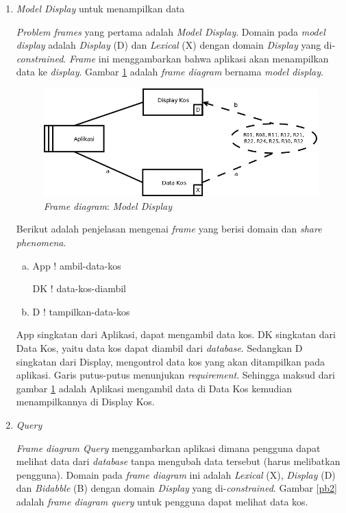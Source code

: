 		\begin{enumerate}[-]
			\item \textit{Model Display} untuk menampilkan data
			
			\textit{Problem frames} yang pertama adalah \textit{Model Display}. Domain pada \textit{model display} adalah \textit{Display} (D) dan \textit{Lexical} (X) dengan domain \textit{Display} yang di-\textit{constrained}. \textit{Frame} ini menggambarkan bahwa aplikasi akan menampilkan data ke \textit{display}. Gambar \ref{pb1} adalah \textit{frame diagram} bernama \textit{model display}.
			
			\begin{figure}[H]
				\centering
				\includegraphics[scale=0.4]{gambar/1}
				\caption{\textit{Frame diagram}: \textit{Model Display}}
				\label{pb1}
			\end{figure}
			
			Berikut adalah penjelasan mengenai \textit{frame} yang berisi domain dan \textit{share phenomena}.
			
			\begin{enumerate}[a.]
				\item App ! ambil-data-kos
				
				DK ! data-kos-diambil
								
				\item D ! tampilkan-data-kos
			\end{enumerate}
		
			App singkatan dari Aplikasi, dapat mengambil data kos. DK singkatan dari Data Kos, yaitu data kos dapat diambil dari \textit{database}. Sedangkan D singkatan dari Display, mengontrol data kos yang akan ditampilkan pada aplikasi. Garis putus-putus menunjukan \textit{requirement}. Sehingga maksud dari gambar \ref{pb1} adalah Aplikasi mengambil data di Data Kos kemudian menampilkannya di Display Kos.
				
			\item \textit{Query}
			
			\textit{Frame diagram Query} menggambarkan aplikasi dimana pengguna dapat melihat data dari \textit{database }tanpa mengubah data tersebut (harus melibatkan pengguna). Domain pada \textit{frame diagram} ini adalah \textit{Lexical} (X), \textit{Display} (D) dan \textit{Bidabble} (B) dengan domain \textit{Display} yang di-\textit{constrained}. Gambar \ref{pb2} adalah \textit{frame diagram query} untuk pengguna dapat melihat data kos.
			

\end{enumerate}
